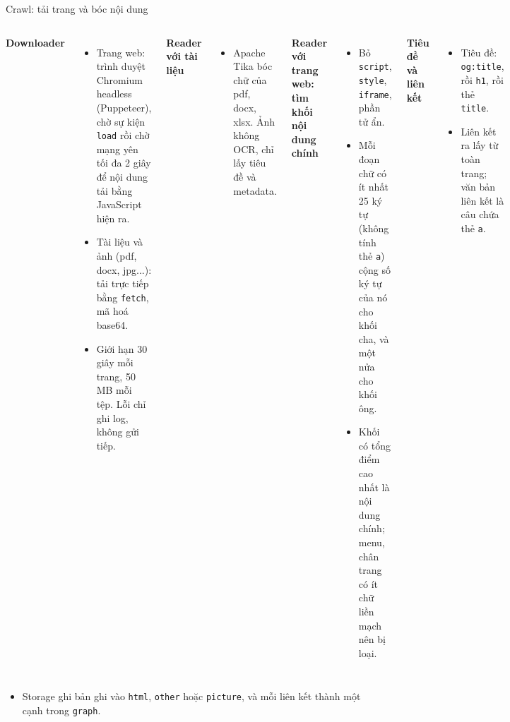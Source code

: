 \documentclass[aspectratio=169,t,10pt]{beamer}
\newcommand{\code}[1]{\texttt{#1}}
\begin{document}
\begin{frame}[shrink]{Crawl: tải trang và bóc nội dung}
\small
\begin{columns}[T,onlytextwidth]
\textbf{Downloader}
\begin{itemize}
  \item Trang web: trình duyệt Chromium headless (Puppeteer), chờ sự kiện \code{load} rồi chờ mạng yên tối đa 2 giây để nội dung tải bằng JavaScript hiện ra.
  \item Tài liệu và ảnh (pdf, docx, jpg...): tải trực tiếp bằng \code{fetch}, mã hoá base64.
  \item Giới hạn 30 giây mỗi trang, 50 MB mỗi tệp. Lỗi chỉ ghi log, không gửi tiếp.
\end{itemize}
\textbf{Reader với tài liệu}
\begin{itemize}
  \item Apache Tika bóc chữ của pdf, docx, xlsx. Ảnh không OCR, chỉ lấy tiêu đề và metadata.
\end{itemize}
\textbf{Reader với trang web: tìm khối nội dung chính}
\begin{itemize}
  \item Bỏ \code{script}, \code{style}, \code{iframe}, phần tử ẩn.
  \item Mỗi đoạn chữ có ít nhất 25 ký tự (không tính thẻ \code{a}) cộng số ký tự của nó cho khối cha, và một nửa cho khối ông.
  \item Khối có tổng điểm cao nhất là nội dung chính; menu, chân trang có ít chữ liền mạch nên bị loại.
\end{itemize}
\textbf{Tiêu đề và liên kết}
\begin{itemize}
  \item Tiêu đề: \code{og:title}, rồi \code{h1}, rồi thẻ \code{title}.
  \item Liên kết ra lấy từ toàn trang; văn bản liên kết là câu chứa thẻ \code{a}.
\end{itemize}
\end{columns}
\vspace{4pt}
\begin{itemize}
  \item Storage ghi bản ghi vào \code{html}, \code{other} hoặc \code{picture}, và mỗi liên kết thành một cạnh trong \code{graph}.
\end{itemize}
\end{frame}
\end{document}
